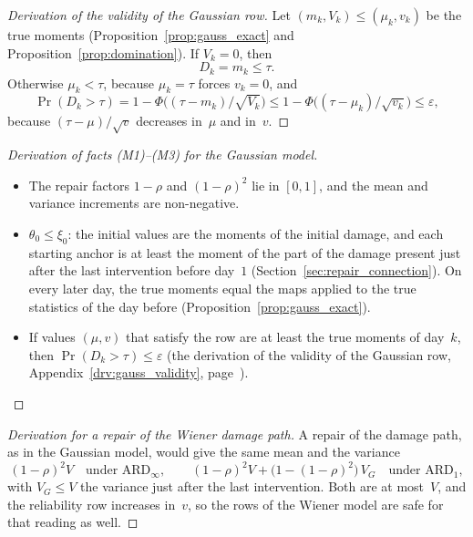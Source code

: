 \documentclass[11pt,a4paper]{article}
\theoremstyle{plain}
\theoremstyle{definition}
\theoremstyle{remark}
\begin{document}
\label{drv:gauss_validity}
\begin{proof}[Derivation of the validity of the Gaussian row]
Let $(m_k, V_k) \le (\mu_k, v_k)$ be the true moments (Proposition~\ref{prop:gauss_exact} and Proposition~\ref{prop:domination}).
If $V_k = 0$, then
\begin{equation}
  D_k = m_k \le \tau.
\end{equation}
Otherwise $\mu_k < \tau$, because $\mu_k = \tau$ forces $v_k = 0$, and
\begin{equation}
  \Pr(D_k > \tau) = 1 - \Phi\bigl((\tau - m_k)/\sqrt{V_k}\bigr) \le 1 - \Phi\bigl((\tau - \mu_k)/\sqrt{v_k}\bigr) \le \varepsilon,
\end{equation}
because $(\tau - \mu)/\sqrt{v}$ decreases in~$\mu$ and in~$v$.
\end{proof}

\label{drv:mfacts_gauss}
\begin{proof}[Derivation of facts (M1)--(M3) for the Gaussian model]
\begin{itemize}
  \item[(M1)] The repair factors $1-\rho$ and $(1-\rho)^2$ lie in $[0, 1]$, and the mean and variance increments are non-negative.
  \item[(M2)] $\theta_0 \le \xi_0$: the initial values are the moments of the initial damage, and each starting anchor is at least the moment of the part of the damage present just after the last intervention before day~$1$ (Section~\ref{sec:repair_connection}).
    On every later day, the true moments equal the maps applied to the true statistics of the day before (Proposition~\ref{prop:gauss_exact}).
  \item[(M3)] If values $(\mu, v)$ that satisfy the row are at least the true moments of day~$k$, then $\Pr(D_k > \tau) \le \varepsilon$ (the derivation of the validity of the Gaussian row, Appendix~\ref{drv:gauss_validity}, page~\pageref{drv:gauss_validity}).
\end{itemize}
\end{proof}

\label{drv:wiener_path}
\begin{proof}[Derivation for a repair of the Wiener damage path]
A repair of the damage path, as in the Gaussian model, would give the same mean and the variance
\begin{equation}
  (1-\rho)^2 V \quad \text{under } \text{ARD}_\infty,
  \qquad
  (1-\rho)^2 V + \bigl(1 - (1-\rho)^2\bigr)\,V_G \quad \text{under } \text{ARD}_1,
\end{equation}
with $V_G \le V$ the variance just after the last intervention.
Both are at most~$V$, and the reliability row increases in~$v$, so the rows of the Wiener model are safe for that reading as well.
\end{proof}
\end{document}
